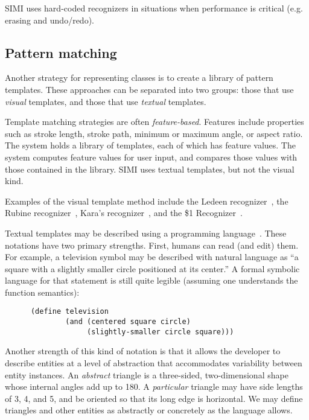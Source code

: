 SIMI uses hard-coded recognizers in situations when performance is
critical (e.g. erasing and undo/redo).

\subsection{Pattern matching}
\label{sec:recognition-library}

Another strategy for representing classes is to create a library of
pattern templates. These approaches can be separated into two groups:
those that use \textit{visual} templates, and those that use
\textit{textual} templates.

Template matching strategies are often
\textit{feature-based}. Features include properties such as stroke
length, stroke path, minimum or maximum angle, or aspect ratio. The
system holds a library of templates, each of which has feature
values. The system computes feature values for user input, and
compares those values with those contained in the library. SIMI uses
textual templates, but not the visual kind.

Examples of the visual template method include the Ledeen
recognizer~\cite{newman-sproull-graphics-2}, the Rubine
recognizer~\cite{rubine-recognizer}, Kara's
recognizer~\cite{kara-recognizer-cg}, and the \$1
Recognizer~\cite{wobbrock-dollar}.

Textual templates may be described using a programming
language~\cite{pasternak-adik,bimber-sketch-bnf,costagliola-xpg,hammond-ladder}. These
notations have two primary strengths. First, humans can read (and
edit) them. For example, a television symbol may be described with
natural language as ``a square with a slightly smaller circle
positioned at its center.'' A formal symbolic language for that
statement is still quite legible (assuming one understands the
function semantics):

\begin{verbatim}
      (define television 
              (and (centered square circle)
                   (slightly-smaller circle square)))
\end{verbatim}

Another strength of this kind of notation is that it allows the
developer to describe entities at a level of abstraction that
accommodates variability between entity
instances. An \textit{abstract} triangle is a three-sided,
two-dimensional shape whose internal angles add up to
180\degree. A \textit{particular} triangle may have side lengths of 3,
4, and 5, and be oriented so that its long edge is horizontal. We may
define triangles and other entities as abstractly or concretely as the
language allows.

